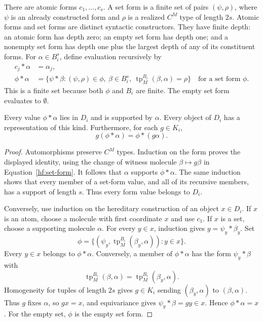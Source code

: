 There are atomic forms $c_1,\ldots,c_s$.  A set form is a finite set
of pairs $(\psi,\rho)$, where $\psi$ is an already constructed form and
$\rho$ is a realized $C^M$ type of length $2s$.
Atomic forms and set forms are distinct syntactic constructors.
They have finite depth: an atomic form has depth zero; an empty set form
has depth one; and a nonempty set form has depth one plus the largest
depth of any of its constituent forms.
For $\alpha\in B_i^s$, define evaluation recursively by
\begin{align}
 c_j*\alpha&=\alpha_j, \label{hf:atomic-form}\\
 \phi*\alpha&=
 \{\psi*\beta:(\psi,\rho)\in\phi,\ \beta\in B_i^s,\
             \operatorname{tp}^{B_i}_M(\beta,\alpha)=\rho\}
       \quad\text{for a set form $\phi$.}
       \label{hf:set-form}
\end{align}
This is a finite set because both $\phi$ and $B_i$ are finite.
The empty set form evaluates to $\emptyset$.

\begin{lemma}
\label{hf:representation}
Every value $\phi*\alpha$ lies in $D_i$ and is supported by $\alpha$.
Every object of $D_i$ has a representation of this kind.
Furthermore, for each $g\in K_i$,
\[
                         g(\phi*\alpha)=\phi*(g\alpha).
\]
\end{lemma}

\begin{proof}
Automorphisms preserve $C^M$ types.  Induction on the form proves the
displayed identity, using the change of witness molecule
$\beta\mapsto g\beta$ in Equation~\eqref{hf:set-form}.
It follows that $\alpha$ supports $\phi*\alpha$.
The same induction shows that every member of a set-form value, and
all of its recursive members, has a support of length $s$.
Thus every form value belongs to $D_i$.

Conversely, use induction on the hereditary construction of an object
$x\in D_i$.  If $x$ is an atom, choose a molecule with first coordinate
$x$ and use $c_1$.  If $x$ is a set, choose a supporting molecule
$\alpha$.  For every $y\in x$, induction gives
$y=\psi_y*\beta_y$.  Set
\[
 \phi=\{(\psi_y,\operatorname{tp}^{B_i}_M(\beta_y,\alpha)):y\in x\}.
\]
Every $y\in x$ belongs to $\phi*\alpha$.  Conversely, a member of
$\phi*\alpha$ has the form $\psi_y*\beta$ with
\[
 \operatorname{tp}^{B_i}_M(\beta,\alpha)
      =\operatorname{tp}^{B_i}_M(\beta_y,\alpha).
\]
Homogeneity for tuples of length $2s$ gives $g\in K_i$ sending
$(\beta_y,\alpha)$ to $(\beta,\alpha)$.
Thus $g$ fixes $\alpha$, so $gx=x$, and equivariance gives
$\psi_y*\beta=gy\in x$.  Hence $\phi*\alpha=x$.
For the empty set, $\phi$ is the empty set form.
\end{proof}

